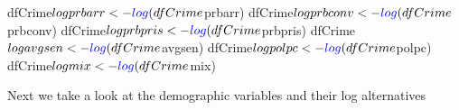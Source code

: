 \documentclass[]{article}
\newenvironment{Shaded}{}{}
\newcommand{\KeywordTok}[1]{\textcolor[rgb]{0.00,0.00,1.00}{#1}}
\newcommand{\NormalTok}[1]{#1}
\newcommand{\OperatorTok}[1]{#1}
\newcommand{\StringTok}[1]{\textcolor[rgb]{0.00,0.50,0.50}{#1}}
\begin{document}
\begin{Shaded}
\begin{Highlighting}[]
\NormalTok{dfCrime}\OperatorTok{$}\NormalTok{logprbarr <-}\StringTok{ }\KeywordTok{log}\NormalTok{(dfCrime}\OperatorTok{$}\NormalTok{prbarr)}
\NormalTok{dfCrime}\OperatorTok{$}\NormalTok{logprbconv <-}\StringTok{ }\KeywordTok{log}\NormalTok{(dfCrime}\OperatorTok{$}\NormalTok{prbconv)}
\NormalTok{dfCrime}\OperatorTok{$}\NormalTok{logprbpris <-}\StringTok{ }\KeywordTok{log}\NormalTok{(dfCrime}\OperatorTok{$}\NormalTok{prbpris)}
\NormalTok{dfCrime}\OperatorTok{$}\NormalTok{logavgsen <-}\StringTok{ }\KeywordTok{log}\NormalTok{(dfCrime}\OperatorTok{$}\NormalTok{avgsen)}
\NormalTok{dfCrime}\OperatorTok{$}\NormalTok{logpolpc <-}\StringTok{ }\KeywordTok{log}\NormalTok{(dfCrime}\OperatorTok{$}\NormalTok{polpc)}
\NormalTok{dfCrime}\OperatorTok{$}\NormalTok{logmix <-}\StringTok{ }\KeywordTok{log}\NormalTok{(dfCrime}\OperatorTok{$}\NormalTok{mix)}
\end{Highlighting}
\end{Shaded}

Next we take a look at the demographic variables and their log
alternatives
\end{document}
